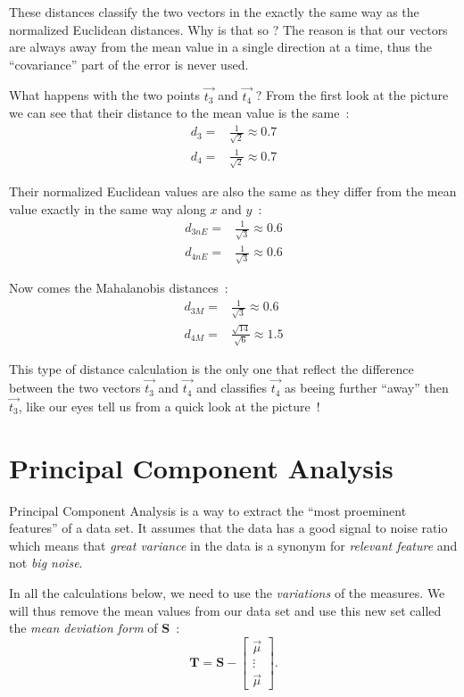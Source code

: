 \documentclass[11pt,twocolumn]{amsart} %
\begin{document}
These distances classify the two vectors in the exactly the same way as the normalized Euclidean distances. Why is that so ? The reason is that our vectors are always away from the mean value in a single direction at a time, thus the ``covariance'' part of the error is never used.

What happens with the two points $\vec{t_3}$ and $\vec{t_4}$ ? From the first look at the picture we can see that their distance to the mean value is the same~:
\begin{align*}
  d_3 = & \frac{1}{\sqrt{2}} \approx 0.7 \\
  d_4 = & \frac{1}{\sqrt{2}} \approx 0.7
\end{align*}

Their normalized Euclidean values are also the same as they differ from the mean value exactly in the same way along $x$ and $y$~:
\begin{align*}
  d_{3nE} = & \frac{1}{\sqrt{3}} \approx 0.6\\
  d_{4nE} = & \frac{1}{\sqrt{3}} \approx 0.6
\end{align*}

Now comes the Mahalanobis distances~:
\begin{align*}
  d_{3M} = & \frac{1}{\sqrt{3}} \approx 0.6\\
  d_{4M} = & \frac{\sqrt{14}}{\sqrt{6}} \approx 1.5
\end{align*}

This type of distance calculation is the only one that reflect the difference between the two vectors $\vec{t_3}$ and $\vec{t_4}$ and classifies $\vec{t_4}$ as beeing further ``away'' then $\vec{t_3}$, like our eyes tell us from a quick look at the picture~!

\section{Principal Component Analysis}

Principal Component Analysis is a way to extract the ``most proeminent features'' of a data set. It assumes that the data has a good signal to noise ratio which means that \emph{great variance} in the data is a synonym for \emph{relevant feature} and not \emph{big noise}.

In all the calculations below, we need to use the \emph{variations} of the measures. We will thus remove the mean values from our data set and use this new set called the \emph{mean deviation form} of \textbf{S}~:
\begin{equation}
  \textbf{T} = \textbf{S} - \begin{bmatrix}\vec{\mu} \\ \vdots \\ \vec{\mu}\end{bmatrix}.
\end{equation}
\end{document}
